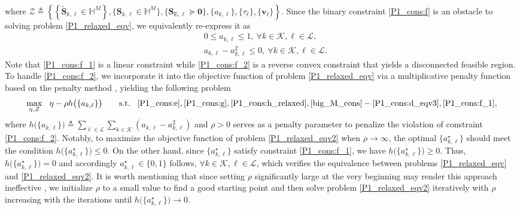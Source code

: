 \documentclass[12pt,draftclsnofoot, onecolumn]{IEEEtran}
\theoremstyle{plain}
\begin{document}
\begin{sloppypar}
\begin{align}
\end{align}
where $\mathcal Z \triangleq \left\lbrace \left\lbrace \tilde{\mathbf S}_{k,\ell} \in \mathbb H^M\right\rbrace, \{\mathbf S_{k,\ell} \in \mathbb H^M\}, \{\mathbf S_{\mathrm E,\ell} \succeq \mathbf 0\}, \{ a_{k,\ell}\}, \{\tau_\ell\},\{\mathbf v_\ell\}\right\rbrace$. Since the binary constraint \eqref{P1_cons:f} is an obstacle to solving problem \eqref{P1_relaxed_eqv}, we equivalently re-express it as 
\begin{subequations}
	\begin{align}
	& 0 \leq a_{k,\ell} \leq 1, \ \forall k\in\mathcal K, \ell \in\mathcal L, \label{P1_cons:f_1}\\
	& a_{k,\ell} - a_{k,\ell}^2 \leq 0, \ \forall k\in\mathcal K, \ell\in\mathcal L. \label{P1_cons:f_2}
	\end{align}
\end{subequations}
Note that \eqref{P1_cons:f_1} is a linear constraint while \eqref{P1_cons:f_2} is a reverse convex constraint that yields a disconnected feasible region. To handle \eqref{P1_cons:f_2}, we incorporate it into the objective function of problem \eqref{P1_relaxed_eqv} via a multiplicative penalty function based on the penalty method \cite{2012_Le_penalty}, yielding the following problem
\begin{align}\label{P1_relaxed_eqv2}
\underset{\eta,\mathcal Z}{\max} \hspace{3mm} \eta - \rho h\big(\{a_{k,\ell}\}\big) \hspace{7mm}
\text{s.t.} \hspace{3mm}  \eqref{P1_cons:e}, \eqref{P1_cons:g}, \eqref{P1_cons:h_relaxed}, \eqref{big_M_cons}-\eqref{P1_cons:d_eqv3}, \eqref{P1_cons:f_1}, 
\end{align} 
where $h\big(\{a_{k,\ell}\}\big) \triangleq \sum_{\ell \in\mathcal L}\sum_{k \in\mathcal K} \left(a_{k,\ell} - a_{k,\ell}^2\right)$ and $\rho > 0$ serves as a penalty parameter to penalize the violation of constraint \eqref{P1_cons:f_2}. Notably, to maximize the objective function of problem \eqref{P1_relaxed_eqv2} when $\rho\rightarrow \infty$, the optimal $\{a_{k,\ell}^\star\}$ should meet the condition $h\big(\{a_{k,\ell}^\star\}\big)\leq 0$. On the other hand, since $\{a_{k,\ell}^\star\}$ satisfy constraint \eqref{P1_cons:f_1}, we have $h\big(\{a_{k,\ell}^\star\}\big) \geq 0$. Thus, $h\big(\{a_{k,\ell}^\star\}\big) = 0$ and accordingly $a_{k,\ell}^\star\in\{0,1\}$ follows, $\forall k\in\mathcal K, \ell\in\mathcal L$, which verifies the equivalence between problems \eqref{P1_relaxed_eqv} and \eqref{P1_relaxed_eqv2}. It is worth mentioning that since setting $\rho$ significantly large at the very beginning may render this approach ineffective \cite{2000_Runarsson_penalty}, we initialize $\rho$ to a small value to find a good starting point and then solve problem \eqref{P1_relaxed_eqv2} iteratively with $\rho$ increasing with the iterations until $h\big({\{a_{k,\ell}^\star\}}\big) \rightarrow 0$. 


\end{sloppypar}
\end{document}
